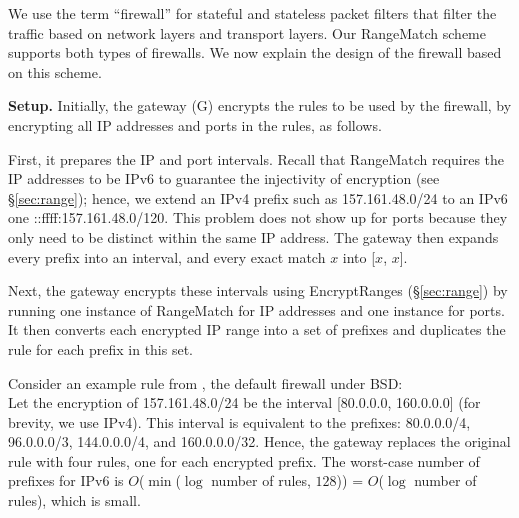 We use the term ``firewall'' for stateful and stateless packet filters that filter the traffic based on network layers and transport layers.
Our RangeMatch scheme supports both types of firewalls. We now explain the design of the firewall based on this scheme.

\noindent\textbf{Setup.} Initially, the gateway (G) encrypts the rules to be used by the firewall, by encrypting all IP addresses and ports in the rules, as follows.

First, it prepares the IP and port intervals. Recall that RangeMatch requires the IP addresses to be IPv6 to guarantee the injectivity of encryption (see \S\ref{sec:range}); hence, we extend an IPv4 prefix  such as 157.161.48.0/24 to an IPv6 one  ::ffff:157.161.48.0/120. 
This problem does not show up for ports because they only need to be distinct within the same IP address.
The gateway then expands every prefix into an interval, and every exact match $x$ into [$x$, $x$]. 

Next, the gateway encrypts these intervals using EncryptRanges (\S\ref{sec:range}) by running one instance of RangeMatch for IP addresses and one instance for ports.
It then converts each encrypted IP range into a set of prefixes and duplicates the rule for each prefix in this set. 

Consider an example rule from  , the 
default firewall under BSD:
  \\ 
Let the encryption of 157.161.48.0/24 be the interval [80.0.0.0, 160.0.0.0] (for brevity, we use IPv4). 
This interval is equivalent to the prefixes: 80.0.0.0/4, 96.0.0.0/3, 144.0.0.0/4, and 160.0.0.0/32. 
Hence, the gateway replaces the original rule with four rules, one for each encrypted prefix. 
The worst-case number of prefixes for IPv6 is $O$($\min$($\log$ number of rules, $128$)) = $O$($\log$ number of rules), 
which is small. 







